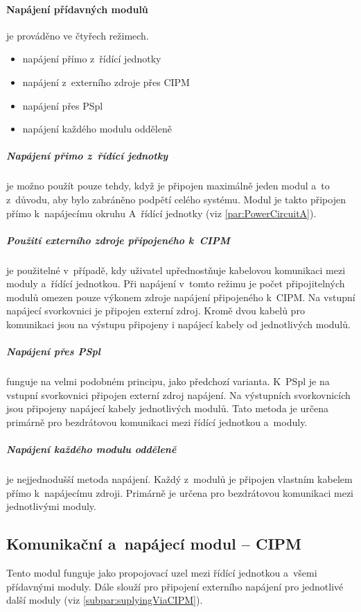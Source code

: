 \paragraph{Napájení přídavných modulů}
je prováděno ve čtyřech režimech.
\begin{itemize}
    \item napájení přímo z~řídící jednotky
    \item napájení z~externího zdroje přes CIPM
    \item napájení přes PSpl
    \item napájení každého modulu odděleně
\end{itemize}

\subparagraph{Napájení přimo z~řídící jednotky}
je možno použít pouze tehdy, když je připojen maximálně jeden modul a~to z~důvodu, aby bylo zabráněno podpětí celého systému.
Modul je takto připojen přímo k~napájecímu okruhu A~řídící jednotky (viz \autoref{par:PowerCircuitA}).

\subparagraph{Použití externího zdroje připojeného k~CIPM}
\label{subpar:suplyingViaCIPM}
je použitelné v~případě, kdy uživatel upřednostňuje kabelovou komunikaci mezi moduly a~řídící jednotkou.
Při napájení v~tomto režimu je počet připojitelných modulů omezen pouze výkonem zdroje napájení připojeného k~CIPM.
Na vstupní napájecí svorkovnici je připojen externí zdroj. 
Kromě dvou kabelů pro komunikaci jsou na výstupu připojeny i napájecí kabely od jednotlivých modulů.

\subparagraph{Napájení přes PSpl}
funguje na velmi podobném principu, jako předchozí varianta. 
K~PSpl je na vstupní svorkovnici připojen externí zdroj napájení.
Na výstupních svorkovnicích jsou připojeny napájecí kabely jednotlivých modulů.
Tato metoda je určena primárně pro bezdrátovou komunikaci mezi řídící jednotkou a~moduly.

\subparagraph{Napájení každého modulu odděleně}
je nejjednodušší metoda napájení.
Každý z~modulů je připojen vlastním kabelem přímo k~napájecímu zdroji.
Primárně je určena pro bezdrátovou komunikaci mezi jednotlivými moduly. 

\subsection{Komunikační a~napájecí modul -- CIPM}
\label{subsec:CIPM}
Tento modul funguje jako propojovací uzel mezi řídící jednotkou a~všemi přídavnými moduly.
Dále slouží pro připojení externího napájení pro jednotlivé další moduly (viz \autoref{subpar:suplyingViaCIPM}).

